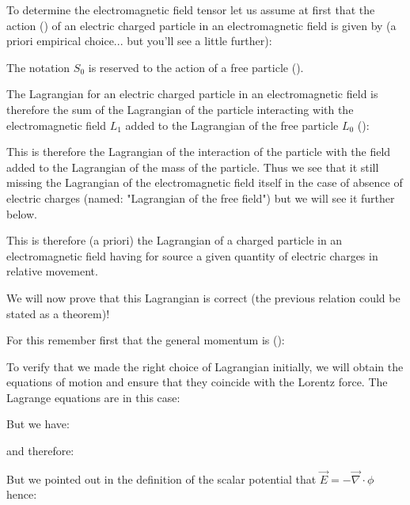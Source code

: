 	To determine the electromagnetic field tensor let us assume at first that the action () of an electric charged particle in an electromagnetic field is given by (a priori empirical choice... but you'll see a little further):
	
	\begin{tcolorbox}[title=Remark,colframe=black,arc=10pt]
	The notation $S_0$ is reserved to the action of a free particle ().
	\end{tcolorbox}
	The Lagrangian for an electric charged particle in an electromagnetic field is therefore the sum of the Lagrangian of the particle interacting with the electromagnetic field $L_1$ added to the Lagrangian of the free particle $L_0$ ():
	
	\begin{tcolorbox}[title=Remark,colframe=black,arc=10pt]
	This is therefore the Lagrangian of the interaction of the particle with the field added to the Lagrangian of the mass of the particle. Thus we see that it still missing the Lagrangian of the electromagnetic field itself in the case of absence of electric charges (named: "Lagrangian of the free field") but we will see it further below.
	\end{tcolorbox}
	This is therefore (a priori) the Lagrangian of a charged particle in an electromagnetic field having for source a given quantity of electric charges in relative movement.
	
	We will now prove that this Lagrangian is correct (the previous relation could be stated as a theorem)!
	
	For this remember first that the general momentum is ():
	
	To verify that we made the right choice of Lagrangian initially, we will obtain the equations of motion and ensure that they coincide with the Lorentz force. The Lagrange equations are in this case:
	
	But we have:
	
	and therefore:
	
	But we pointed out in the definition of the scalar potential that $\vec{E}=-\vec{\nabla}\cdot\phi$ hence:
	
